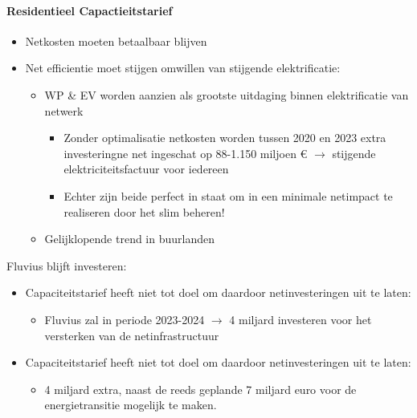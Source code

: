 \documentclass[12pt]{article}
\begin{document}
\paragraph{Residentieel Capactieitstarief}
\begin{itemize}
    \item Netkosten moeten betaalbaar blijven
    \item Net efficientie moet stijgen omwillen van stijgende elektrificatie:\begin{itemize}
        \item WP \& EV worden aanzien als grootste uitdaging binnen elektrificatie van netwerk\begin{itemize}
            \item Zonder optimalisatie netkosten worden tussen 2020 en 2023 extra investeringne net ingeschat op 88-1.150 miljoen € $\rightarrow$ stijgende elektriciteitsfactuur voor iedereen 
            \item Echter zijn beide perfect in staat om in een minimale netimpact te realiseren door het slim beheren!
        \end{itemize}
        \item Gelijklopende trend in buurlanden
    \end{itemize}
\end{itemize}
Fluvius blijft investeren:\begin{itemize}
    \item Capaciteitstarief heeft niet tot doel om daardoor netinvesteringen uit te laten:\begin{itemize}
        \item Fluvius zal in periode 2023-2024 $\rightarrow$ 4 miljard investeren voor het versterken van de netinfrastructuur
    \end{itemize}
    \item Capaciteitstarief heeft niet tot doel om daardoor netinvesteringen uit te laten:\begin{itemize}
        \item 4 miljard extra, naast de reeds geplande 7 miljard euro voor de energietransitie mogelijk te maken.
    \end{itemize}
\end{itemize}
\end{document}
